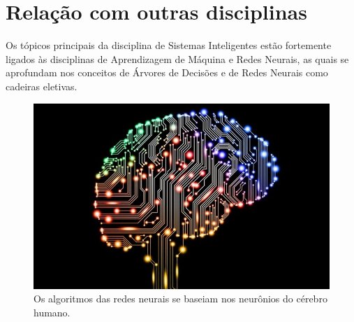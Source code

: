 \documentclass{article}
\begin{document}
\section{Relação com outras disciplinas}
\label{maquina}
Os tópicos principais da disciplina de Sistemas Inteligentes estão fortemente ligados às disciplinas de Aprendizagem de Máquina \cite{maquina} e Redes Neurais, as quais se aprofundam nos conceitos de Árvores de Decisões e de Redes Neurais como cadeiras eletivas.

\begin{figure}[h!]
\centering
\includegraphics[scale=0.4]{cerebro.jpg}
\caption{\cite{2} Os algoritmos das redes neurais se baseiam nos neurônios do cérebro humano.}
\label{fig:cerebro.jpg}
\end{figure}




\end{document}

